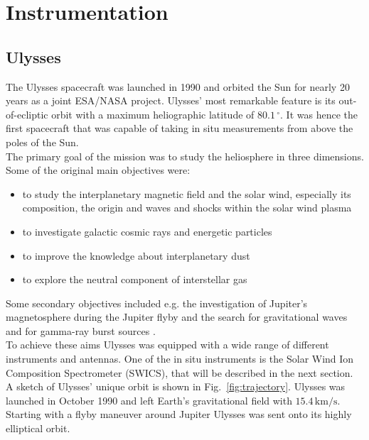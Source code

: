 
\chapter{Instrumentation} %

\label{chapter:instrumentation} 



\section{Ulysses}
\label{sec:ulysses}
The Ulysses spacecraft \citep{wenzel_ulysses} was launched in 1990 and orbited the Sun for nearly 20 years as a joint ESA/NASA project.
Ulysses' most remarkable feature is its out-of-ecliptic orbit with a maximum heliographic latitude of $80.1\,^\circ$.
It was hence the first spacecraft that was capable of taking in situ measurements from above the poles of the Sun.\\
The primary goal of the mission was to study the heliosphere in three dimensions. Some of the original main objectives were:
\begin{itemize}
	\item to study the interplanetary magnetic field and the solar wind, especially its composition, the origin and waves and shocks within the solar wind plasma
	\item to investigate galactic cosmic rays and energetic particles
	\item to improve the knowledge about interplanetary dust
	\item to explore the neutral component of interstellar gas
\end{itemize}
Some secondary objectives included e.g. the investigation of Jupiter's magnetosphere during the Jupiter flyby and the search for gravitational waves and for gamma-ray burst sources \citep{wenzel_ulysses}.
\\
To achieve these aims Ulysses was equipped with a wide range of different instruments and antennas. One of the in situ instruments is the Solar Wind Ion Composition Spectrometer (SWICS), that will be described in the next section.\\
A sketch of Ulysses' unique orbit is shown in Fig.~\ref{fig:trajectory}.
Ulysses was launched in October 1990 and left Earth's gravitational field with $15.4\,\mathrm{km/s}$. Starting with a flyby maneuver around Jupiter Ulysses was sent onto its highly elliptical orbit.
